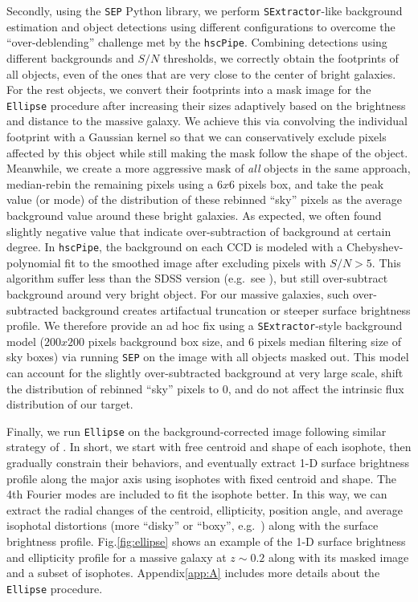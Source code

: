 \documentclass{emulateapj}
\begin{document}
\begin{CJK*}{UTF8}{gbsn}
    Secondly, using the \texttt{SEP} Python library, we perform \texttt{SExtractor}-like
    background estimation and object detections using different configurations to 
    overcome the ``over-deblending'' challenge met by the \texttt{hscPipe}. 
    Combining detections using different backgrounds and $S/N$ thresholds, 
    we correctly obtain the footprints of all objects, even of the ones that are 
    very close to the center of bright galaxies.
    For the rest objects, we convert their footprints into a mask image for the
    \texttt{Ellipse} procedure after increasing their sizes adaptively based on the 
    brightness and distance to the massive galaxy. 
    We achieve this via convolving the individual footprint with a Gaussian kernel
    so that we can conservatively exclude pixels affected by this object while still 
    making the mask follow the shape of the object. 
    Meanwhile, we create a more aggressive mask of \emph{all} objects in the same 
    approach, median-rebin the remaining pixels using a $6x6$ pixels box, and take 
    the peak value (or mode) of the distribution of these rebinned ``sky'' pixels 
    as the average background value around these bright galaxies.
    As expected, we often found slightly negative value that indicate over-subtraction 
    of background at certain degree. 
    In \texttt{hscPipe}, the background on each CCD is modeled with a 
    Chebyshev-polynomial fit to the smoothed image after excluding pixels with $S/N >5$.
    This algorithm suffer less than the SDSS version (e.g.\ see \citealt{Blanton2011}),
    but still over-subtract background around very bright object. 
    For our massive galaxies, such over-subtracted background creates artifactual
    truncation or steeper surface brightness profile.
    We therefore provide an ad hoc fix using a \texttt{SExtractor}-style background 
    model ($200x200$ pixels background box size, and 6 pixels median filtering size of 
    sky boxes) via running \texttt{SEP} on the image with all objects masked out.
    This model can account for the slightly over-subtracted background at very large 
    scale, shift the distribution of rebinned ``sky'' pixels to 0, and do not affect the 
    intrinsic flux distribution of our target. 
    
    Finally, we run \texttt{Ellipse} on the background-corrected image following similar 
    strategy of \citep{Li2012}.
    In short, we start with free centroid and shape of each isophote, then gradually 
    constrain their behaviors, and eventually extract 1-D surface brightness profile 
    along the major axis using isophotes with fixed centroid and shape.
    The 4th Fourier modes are included to fit the isophote better. 
    In this way, we can extract the radial changes of the centroid, ellipticity, 
    position angle, and average isophotal distortions (more ``disky'' or ``boxy'', 
    e.g.\ \citealt{Kormendy2009}) along with the surface brightness profile.  
    Fig.\ref{fig:ellipse} shows an example of the 1-D surface brightness and 
    ellipticity profile for a massive galaxy at $z\sim0.2$ along with its masked 
    image and a subset of isophotes.  
    Appendix\ref{app:A} includes more details about the \texttt{Ellipse} procedure.
    

\end{CJK*}
\end{document}
